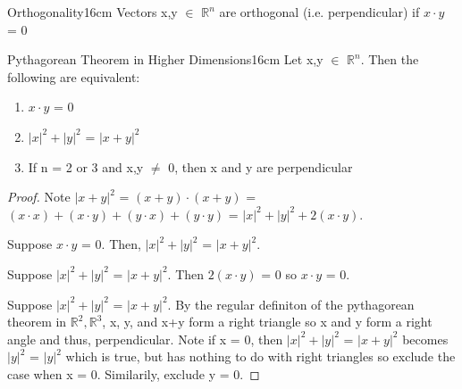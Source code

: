     \vspace{0.5cm}



    \begin{definition}{Orthogonality}{16cm}
        Vectors x,y $\in$ $\mathbb{R}^n$
        are {\color{lblue} orthogonal} (i.e. perpendicular)
        if $x \cdot y$ = 0
    \end{definition}

    \vspace{0.5cm}



    \begin{wtheorem}{Pythagorean Theorem in Higher Dimensions}{16cm}
        Let x,y $\in$ $\mathbb{R}^n$. Then the following are equivalent:

        \begin{enumerate}[label=(\alph*), leftmargin=1cm, itemsep=0.1cm]
            \item $x \cdot y$ = 0
            
            \item $|x|^2 + |y|^2$ = $|x+y|^2$
            
            \item If n = 2 or 3 and x,y $\not =$ 0, then x and y
                are perpendicular
        \end{enumerate}
    \end{wtheorem}

    \begin{proof}
        Note 
        $|x+y|^2$
        = $(x+y) \cdot (x+y)$
        = $(x \cdot x) + (x \cdot y) + (y \cdot x) + (y \cdot y)$
        = $|x|^2 + |y|^2 + 2(x \cdot y)$.

        \vspace{0.2cm}

        Suppose $x \cdot y$ = 0.
        Then, $|x|^2 + |y|^2$ = $|x+y|^2$.

        \vspace{0.2cm}

        Suppose $|x|^2 + |y|^2$ = $|x+y|^2$.
        Then $2(x \cdot y)$ = 0 so $x \cdot y$ = 0.

        \vspace{0.2cm}

        Suppose $|x|^2 + |y|^2$ = $|x+y|^2$.
        By the regular definiton of the pythagorean theorem in
        $\mathbb{R}^2,\mathbb{R}^3$, x, y, and x+y form a right triangle
        so x and y form a right angle and thus, perpendicular.
        Note if x = 0, then $|x|^2 + |y|^2$ = $|x+y|^2$
        becomes $|y|^2$ = $|y|^2$ which is true, but has nothing to do with
        right triangles so exclude the case when x = 0. Similarily, exclude y = 0.
    \end{proof}

